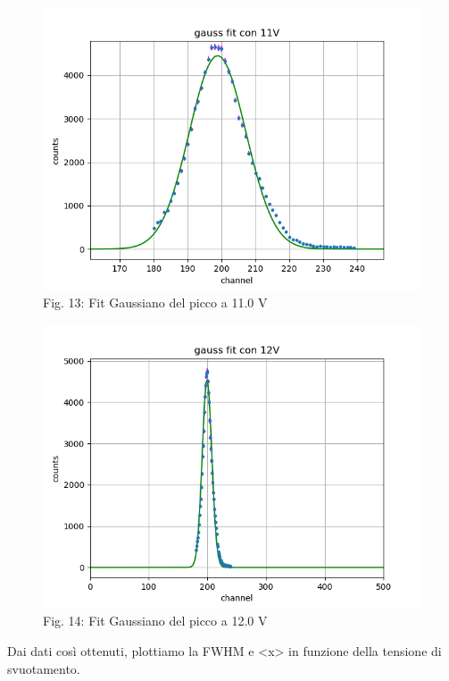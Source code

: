 \documentclass[a4paper]{article}
\begin{document}
\begin{figure}[H]
\includegraphics[width=1\textwidth]{Fit_Gaussiano_con_11V}
        \caption{Fig. 13: Fit Gaussiano del picco a 11.0 V}
        \label{fig:13}
        \end{figure}
        
        \begin{figure}[H]
\includegraphics[width=1\textwidth]{Fit_Gaussiano_con_12V}
        \caption{Fig. 14: Fit Gaussiano del picco a 12.0 V}
        \label{fig:14}        
\end{figure}
\newpage


	
Dai dati così ottenuti, plottiamo la FWHM e <x> in funzione della tensione di svuotamento.
\end{document}

